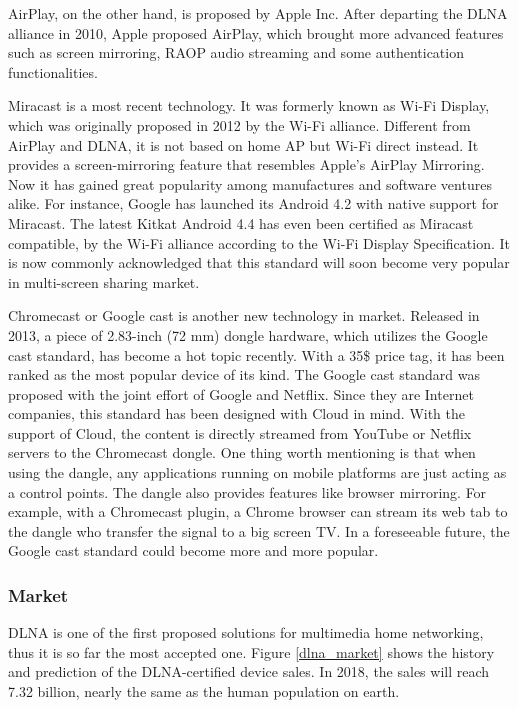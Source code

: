AirPlay, on the other hand, is proposed by Apple Inc. After departing the DLNA alliance in 2010, Apple proposed AirPlay, which brought more advanced features such as screen mirroring, RAOP audio streaming and some authentication functionalities.

Miracast is a most recent technology. It was formerly known as Wi-Fi Display, which was originally proposed in 2012 by the Wi-Fi alliance. Different from AirPlay and DLNA, it is not based on home AP but Wi-Fi direct instead. It provides a screen-mirroring feature that resembles Apple's AirPlay Mirroring. Now it has gained great popularity among manufactures and software ventures alike. For instance, Google has launched its Android 4.2 with native support for Miracast. The latest Kitkat Android 4.4 has even been certified as Miracast compatible, by the Wi-Fi alliance according to the Wi-Fi Display Specification. It is now commonly acknowledged that this standard will soon become very popular in multi-screen sharing market.

Chromecast or Google cast is another new technology in 
market. Released in 2013, a piece of 2.83-inch (72 mm) dongle hardware, which utilizes the Google cast standard, has become a hot topic recently. With a 35\$ price tag, it has been ranked as the most 
popular device of its kind. The Google cast standard was proposed with the joint effort of 
Google and Netflix. Since they are Internet companies, this standard has been 
designed with Cloud in mind. With the support of Cloud, the content is directly streamed from YouTube or Netflix servers to the Chromecast dongle. One thing worth mentioning is that when using the dangle, any applications running on mobile platforms are just acting as a control points. The dangle also provides features like browser mirroring. For example, with a Chromecast plugin, a Chrome browser can stream its web tab to the dangle who transfer the signal to a big screen TV. In a foreseeable future, the Google cast standard could become more and more popular. 
\subsubsection{Market\label{2_3_2}} 
DLNA is one of the first proposed solutions for multimedia home 
networking, thus it is so far the most accepted one. Figure 
\ref{dlna_market} shows the history and prediction of the DLNA-certified device sales. In 2018, the 
sales will reach 7.32 billion, nearly the same as the human population on earth.


